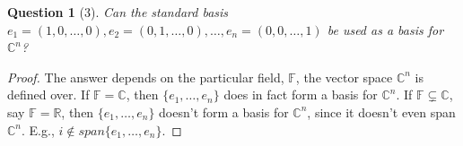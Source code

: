 \documentclass[11pt]{article}
\theoremstyle{quest}
\newtheorem*{question}{Question}
\begin{document}
\begin{question}[3]
Can the standard basis $e_1 = (1, 0, \ldots, 0), e_2 = (0, 1, \ldots, 0), \ldots, e_n = (0, 0, \ldots, 1)$ be used as a basis for $\mathbb{C}^n$?
\end{question}
\begin{proof}
The answer depends on the particular field, $\mathbb{F}$, the  vector space $\mathbb{C}^n$ is defined over. If $\mathbb{F} = \mathbb{C}$, then $\{e_1, \ldots, e_n\}$ does in fact form a basis for $\mathbb{C}^n$. If $\mathbb{F} \subsetneq \mathbb{C}$, say $\mathbb{F} = \mathbb{R}$, then $\{e_1, \ldots, e_n\}$ doesn't form a basis for $\mathbb{C}^n$, since it doesn't even span $\mathbb{C}^n$. E.g., $i \notin span\{e_1, \ldots, e_n\}$.
\end{proof}
\end{document}
